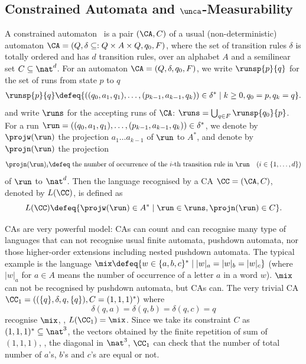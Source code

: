 \subsection{Constrained Automata and \(\unca\)-Measurability}
A constrained automaton~\cite{UnCA} is a pair
\((\CA, C)\) of a usual (non-deterministic) automaton \(\CA = (Q,
\delta \subseteq: Q \times A \times Q, q_0, F)\),
where the set of transition rules \(\delta\) is totally ordered and has
\(d\) transition rules,
over an
alphabet \(A\) and a semilinear set \(C \subseteq \nat^d\).
For an automaton \(\CA = (Q, \delta, q_0, F)\), we write
\(\runsp{p}{q}\) for the set of runs from state \(p\) to \(q\)
\begin{align*}
 \runsp{p}{q} \defeq \{ ((q_0, a_1, q_1), \ldots, (p_{k-1}, a_{k-1}, q_k))
 \in \delta^* \mid k \geq 0, q_0 = p, q_{k} = q \}.
\end{align*}
and write \(\runs\) for the accepting runs of \(\CA\):
\(\runs = \bigcup_{q \in F} \runsp{q_0}{p}\).
For a run \(\run = ((q_0, a_1, q_1), \ldots, (p_{k-1}, a_{k-1}, q_k))
\in \delta^*\), we denote by \(\projw(\run)\) the projection
\(a_1 \ldots a_{k-1}\) of \(\run\) to \(A^*\),
and denote by \(\projn(\run)\) the projection
\[
 \projn(\run)_i \defeq \text{ the number of occurrence of the \(i\)-th
 transition rule in } \run \quad (i \in \{1, \ldots, d\})
\]
of \(\run\) to \(\nat^d\).
Then the language recognised by a CA \(\CC = (\CA, C)\), denoted by \(L(\CC)\), is defined as
\[
 L(\CC) \defeq \{ \projw(\run) \in A^* \mid \run \in \runs, \projn(\run)
 \in C\}.
\]

CAs are very powerful model: CAs can count and can recognise
many type of languages that can not recognise usual finite automata,
pushdown automata, nor those higher-order extensions including
nested pushdown automata.
The typical example is the language \(\mix \defeq \{ w \in \{a,b,c\}^*
\mid |w|_a = |w|_b = |w|_c\}\) (where \(|w|_a\) for \(a \in A\) means
the number of occurrence of a letter \(a\) in a word \(w\)).
\(\mix\) can not be recognised by pushdown automata, but CAs can.
The very trivial CA \(\CC_1 = ((\{q\}, \delta, q, \{q\}), C = (1,1,1)^*)\) where
\[
 \delta(q, a) = \delta(q, b) = \delta(q, c) = q
\]
recognise \(\mix\), \ie, \(L(\CC_1) = \mix\).
Since we take its constraint \(C\) as \((1,1,1)^* \subseteq \nat^3\),
the vectors obtained by the finite repetition of sum of \((1,1,1)\),
\ie, the diagonal in \(\nat^3\), \(\CC_1\) can check that the number of total number of \(a\)'s, \(b\)'s and \(c\)'s are equal or not.

